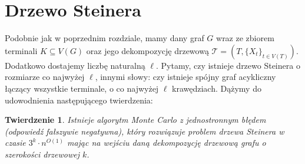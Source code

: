 \documentclass[12pt, oneside]{report}
\newtheorem{theorem}{Twierdzenie}
\newcommand\Omicron{O}
\begin{document}
    	\section{Drzewo Steinera}
Podobnie jak w poprzednim rozdziale, mamy dany graf $G$ wraz ze zbiorem terminali $K \subseteq V(G)$ oraz jego dekompozycję drzewową $\mathcal{T} = (T, \{X_t\}_{t \in V(T)})$. Dodatkowo dostajemy liczbę naturalną $\ell$. Pytamy, czy istnieje drzewo Steinera o rozmiarze co najwyżej $\ell$, innymi słowy: czy istnieje spójny graf acykliczny łączący wszystkie terminale, o co najwyżej $\ell$ krawędziach. Dążymy do udowodnienia następującego twierdzenia:

\begin{theorem}
\label{monte_carlo}
Istnieje algorytm Monte Carlo z jednostronnym błędem (odpowiedź fałszywie negatywna), który rozwiązuje problem drzewa Steinera w czasie $3^k \cdot n^{\Omicron(1)}$ mając na wejściu daną dekompozycję drzewową grafu o szerokości drzewowej $k$.
\end{theorem}
\end{document}
